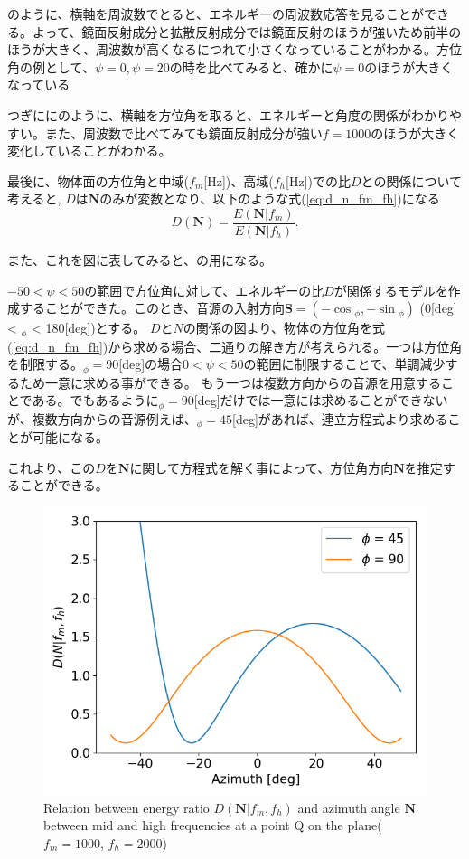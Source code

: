 のように、横軸を周波数でとると、エネルギーの周波数応答を見ることができる。よって、鏡面反射成分と拡散反射成分では鏡面反射のほうが強いため前半のほうが大きく、周波数が高くなるにつれて小さくなっていることがわかる。方位角の例として、$\psi=0, \psi=20$の時を比べてみると、確かに$\psi=0$のほうが大きくなっている

つぎににのように、横軸を方位角を取ると、エネルギーと角度の関係がわかりやすい。また、周波数で比べてみても鏡面反射成分が強い$f=1000$のほうが大きく変化していることがわかる。

最後に、物体面の方位角と中域($f_m$[Hz])、高域($f_h$[Hz])での比$D$との関係について考えると, $D$は$\mathbf{N}$のみが変数となり、以下のような式(\ref{eq:d_n_fm_fh})になる
\begin{equation}
	\label{eq:d_n_fm_fh}
	D(\mathbf{N}) = \frac{E(\mathbf{N}|f_{m})}{E(\mathbf{N}|f_{h})}.
\end{equation}

また、これを図に表してみると、の用になる。

$-50< \psi < 50$の範囲で方位角に対して、エネルギーの比$D$が関係するモデルを作成することができた。このとき、音源の入射方向$\mathbf{S} = (-\cos{_\phi}, -\sin{_\phi})$ (0[deg] < $_\phi$ < 180[deg])とする。
$D$と$N$の関係の図より、物体の方位角を式(\ref{eq:d_n_fm_fh})から求める場合、二通りの解き方が考えられる。一つは方位角を制限する。$_\phi=90$[deg]の場合$0<\psi<50$の範囲に制限することで、単調減少するため一意に求める事ができる。
もう一つは複数方向からの音源を用意することである。でもあるように$_\phi=90$[deg]だけでは一意には求めることができないが、複数方向からの音源例えば、$_\phi = 45$[deg]があれば、連立方程式より求めることが可能になる。

これより、この$D$を$\mathbf{N}$に関して方程式を解く事によって、方位角方向$\mathbf{N}$を推定することができる。

\begin{figure}[t]
  \begin{center}
  \vspace{1zh}
    \includegraphics[width=0.7\linewidth]{images/Re2_d_n.png}   
  \end{center}
  \caption{Relation between energy ratio $D(\mathbf{N}|f_m, f_h)$ and azimuth angle $\mathbf{N}$ between mid and high frequencies at a point Q on the plane($f_m = 1000$, $f_h = 2000$)}
  \label{fig:d-n}
\end{figure}

